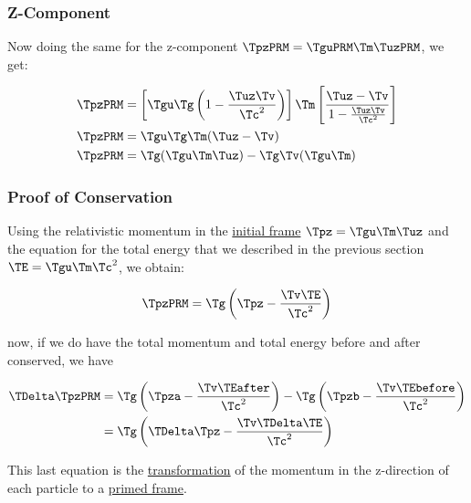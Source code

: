 \begin{derivation}
\subsubsection{Z-Component}

Now doing the same for the z-component $\TpzPRM  = \TguPRM  \Tm  \TuzPRM $, we get:

\begin{equation}
\begin{aligned}
	\TpzPRM  & = \left[ \Tgu  \Tg  \left(1 - \frac{\Tuz  \Tv }{\Tc ^2}\right) \right] \Tm  \left[ \frac{\Tuz  - \Tv }{1 - \frac{\Tuz  \Tv }{\Tc ^2} } \right] \\
	\TpzPRM  & = \Tgu  \Tg  \Tm  (\Tuz  - \Tv )                                                                                              \\
	\TpzPRM  & = \Tg  (\Tgu  \Tm  \Tuz ) - \Tg  \Tv  (\Tgu  \Tm )
\end{aligned}
\end{equation}

\subsubsection{Proof of Conservation}

Using the relativistic momentum in the \hyperlink{def-initial-Frame}{initial frame} $\Tpz  = \Tgu  \Tm  \Tuz $ and the equation for the total energy that we described in the previous section $\TE  = \Tgu  \Tm  \Tc ^2$, we obtain:

\begin{equation}
	\TpzPRM  = \Tg  \left( \Tpz  - \frac{\Tv  \TE }{\Tc ^2} \right)
\end{equation}

now, if we do have the total momentum and total energy before and after conserved, we have

\begin{equation}
	\begin{aligned}
		\TDelta  \TpzPRM  &= \Tg  \left( \Tpza  - \frac{\Tv  \TEafter }{\Tc ^2} \right) - \Tg  \left( \Tpzb  - \frac{\Tv  \TEbefore }{\Tc ^2} \right) \\
		&= \Tg  \left( \TDelta  \Tpz  - \frac{\Tv  \TDelta  \TE }{\Tc ^2} \right)
	\end{aligned}
\end{equation}

This last equation is the \hyperlink{def-transform}{transformation} of the momentum in the z-direction of each particle to a \hyperlink{def-Primed-Frame}{primed frame}.


\end{derivation}
